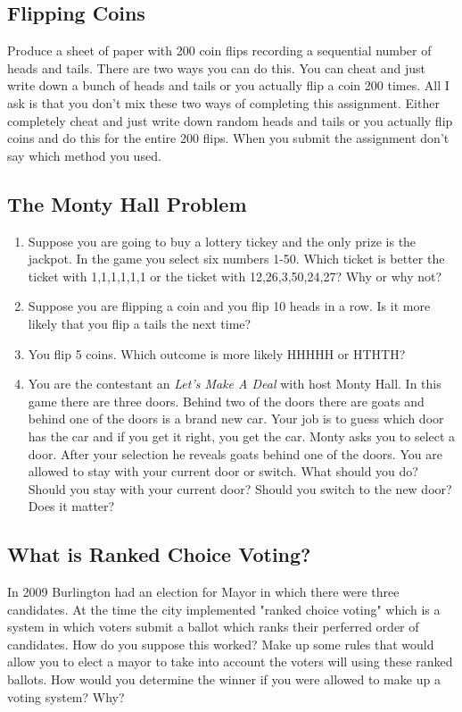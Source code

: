 \documentclass[]{article}
\numberwithin{equation}{section}
\theoremstyle{definition}
\theoremstyle{remark}
\begin{document}
\subsection{Flipping Coins }
Produce a sheet of paper with 200 coin flips recording a sequential number of heads and tails. There are two ways you can do this. 
You can cheat and just write down a bunch of heads and tails or you actually flip a coin 200 times. 
All I ask is that you don't mix these two ways of completing this assignment.
Either completely cheat and just write down random heads and tails or you actually flip coins and do this for the entire 200 flips.
When you submit the assignment don't say which method you used.

\subsection{The Monty Hall Problem } 
\begin{enumerate}
	\item Suppose you are going to buy a lottery tickey and the only prize is the jackpot. In the game you select six numbers 1-50. Which ticket is better the ticket with 1,1,1,1,1,1 or the ticket with 12,26,3,50,24,27? Why or why not?
	\item Suppose you are flipping a coin and you flip 10 heads in a row. Is it more likely that you flip a tails the next time?
	\item You flip 5 coins. Which outcome is more likely HHHHH or HTHTH?
	\item You are the contestant an \emph{Let's Make A Deal} with host Monty Hall. In this game there are three doors. Behind two of the doors there are goats and behind one of the doors is a brand new car. Your job is to guess which door has the car and if you get it right, you get the car. Monty asks you to select a door. After your selection he reveals goats behind one of the doors. You are allowed to stay with your current door or switch. What should you do? Should you stay with your current door? Should you switch to the new door? Does it matter?
\end{enumerate}

\subsection{What is Ranked Choice Voting? }
In 2009 Burlington had an election for Mayor in which there were three candidates. At the time the city implemented "ranked choice voting" which is a system in which voters submit a ballot which ranks their perferred order of candidates. How do you suppose this worked? Make up some rules that would allow you to elect a mayor to take into account the voters will using these ranked ballots. How would you determine the winner if you were allowed to make up a voting system? Why?
	
\end{document}
